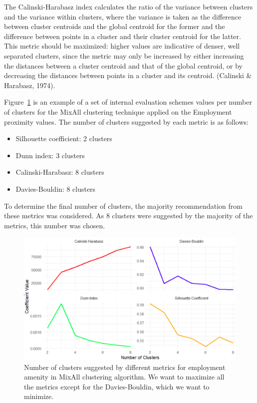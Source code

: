 \documentclass[11pt, a4paper]{article}
\begin{document}
\par
The Calinski-Harabasz index calculates the ratio of the variance between clusters and the variance within clusters, where the variance is taken as the difference between cluster centroids and the global centroid for the former and the difference between points in a cluster and their cluster centroid for the latter. This metric should be maximized: higher values are indicative of denser, well separated clusters, since the metric may only be increased by either increasing the distances between a cluster centroid and that of the global centroid, or by decreasing the distances between points in a cluster and its centroid. (Calinski \& Harabasz, 1974).
\par
Figure~\ref{numselect} is an example of a set of internal evaluation schemes values per number of clusters for the MixAll clustering technique applied on the Employment proximity values. The number of clusters suggested by each metric is as follows:

\begin{itemize}
\item Silhouette coefficient: 2 clusters
\item Dunn index: 3 clusters
\item Calinski-Harabasz: 8 clusters
\item Davies-Bouldin: 8 clusters
\end{itemize}

To determine the final number of clusters, the majority recommendation from these metrics was considered. As 8 clusters were suggested by the majority of the metrics, this number was chosen.







\begin{figure}[H]
\centering
\includegraphics[width=\textwidth]{./coefs_demo/coefs_demo.png}
\caption[Number of cluster selection]{Number of clusters suggested by different metrics for employment amenity in MixAll clustering algorithm. We want to maximize all the metrics except for the Davies-Bouldin, which we want to minimize.}\label{numselect}
\end{figure}
\end{document}
